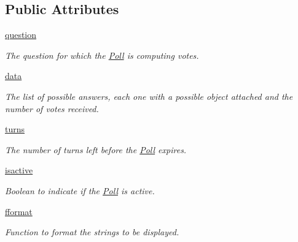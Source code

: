 \subsection*{\-Public \-Attributes}
\begin{DoxyCompactItemize}
\item 
\hypertarget{classGame_1_1Poll_ab2a518ed49b8954328633a6688f92eba}{\hyperlink{classGame_1_1Poll_ab2a518ed49b8954328633a6688f92eba}{question}}\label{classGame_1_1Poll_ab2a518ed49b8954328633a6688f92eba}

\begin{DoxyCompactList}\small\item\em \-The question for which the \hyperlink{classGame_1_1Poll}{\-Poll} is computing votes. \end{DoxyCompactList}\item 
\hypertarget{classGame_1_1Poll_a0ee0be48aad1272d32183d5a7225d9d9}{\hyperlink{classGame_1_1Poll_a0ee0be48aad1272d32183d5a7225d9d9}{data}}\label{classGame_1_1Poll_a0ee0be48aad1272d32183d5a7225d9d9}

\begin{DoxyCompactList}\small\item\em \-The list of possible answers, each one with a possible object attached and the number of votes received. \end{DoxyCompactList}\item 
\hypertarget{classGame_1_1Poll_aab48c01def4aaceda096f10c54dc1af4}{\hyperlink{classGame_1_1Poll_aab48c01def4aaceda096f10c54dc1af4}{turns}}\label{classGame_1_1Poll_aab48c01def4aaceda096f10c54dc1af4}

\begin{DoxyCompactList}\small\item\em \-The number of turns left before the \hyperlink{classGame_1_1Poll}{\-Poll} expires. \end{DoxyCompactList}\item 
\hypertarget{classGame_1_1Poll_ae7e10eae049169a19fe46d49b32549ec}{\hyperlink{classGame_1_1Poll_ae7e10eae049169a19fe46d49b32549ec}{isactive}}\label{classGame_1_1Poll_ae7e10eae049169a19fe46d49b32549ec}

\begin{DoxyCompactList}\small\item\em \-Boolean to indicate if the \hyperlink{classGame_1_1Poll}{\-Poll} is active. \end{DoxyCompactList}\item 
\hypertarget{classGame_1_1Poll_abdbd477f2415fa8b1549eac2bfb4698c}{\hyperlink{classGame_1_1Poll_abdbd477f2415fa8b1549eac2bfb4698c}{fformat}}\label{classGame_1_1Poll_abdbd477f2415fa8b1549eac2bfb4698c}

\begin{DoxyCompactList}\small\item\em \-Function to format the strings to be displayed. \end{DoxyCompactList}\end{DoxyCompactItemize}


